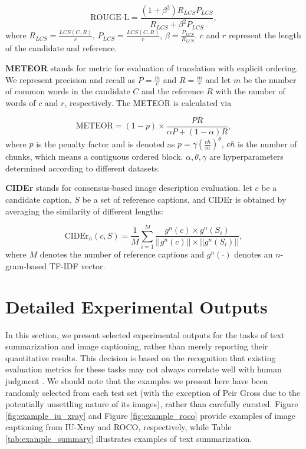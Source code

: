 \documentclass[10pt]{article} \usepackage[preprint]{tmlr}
\begin{document}
\begin{equation}
    \text{ROUGE-L} = \frac{(1+\beta^2) R_{LCS} P_{LCS}}{R_{LCS} + \beta^2 P_{LCS}},
\end{equation}
where $R_{LCS}=\frac{LCS(C,R)}{c}$, $P_{LCS}=\frac{LCS(C,R)}{r}$, $\beta=\frac{P_{LCS}}{R_{LCS}}$. $c$ and $r$ represent the length of the candidate and reference.

\vspace{5pt}
\noindent \textbf{METEOR} stands for metric for evaluation of translation with explicit ordering. We represent precision and recall as $P=\frac{m}{c}$ and $R=\frac{m}{r}$ and let $m$ be the number of common words in the candidate $C$ and the reference $R$ with the number of words of $c$ and $r$, respectively. The METEOR is calculated via

\begin{equation}
    \text{METEOR} = (1 - p) \times \frac{PR}{\alpha P + (1-\alpha) R},
\end{equation}
where $p$ is the penalty factor and is denoted as $p=\gamma (\frac{ch}{m})^{\theta}$, $ch$ is the number of chunks, which means a contiguous ordered block. $\alpha, \theta, \gamma$ are hyperparameters determined according to different datasets.

\vspace{5pt}
\noindent \textbf{CIDEr} stands for consensus-based image description evaluation. let $c$ be a candidate caption, $S$ be a set of reference captions, and CIDEr is obtained by averaging the similarity of different lengths:

\begin{equation}
    \text{CIDEr}_n (c,S) = \frac{1}{M} \sum_{i=1}^M \frac{g^n(c) \times g^n(S_i)}{||g^n(c)|| \times ||g^n(S_i)||},
\end{equation}
where $M$ denotes the number of reference captions and $g^n(\cdot)$ denotes an $n$-gram-based TF-IDF vector.

\section{Detailed Experimental Outputs}
In this section, we present selected experimental outputs for the tasks of text summarization and image captioning, rather than merely reporting their quantitative results. This decision is based on the recognition that existing evaluation metrics for these tasks may not always correlate well with human judgment \citep{kilickaya2017re, cui2018learning}. We should note that the examples we present here have been randomly selected from each test set (with the exception of Peir Gross due to the potentially unsettling nature of its images), rather than carefully curated. Figure \ref{fig:example_iu_xray} and Figure \ref{fig:example_roco} provide examples of image captioning from IU-Xray and ROCO, respectively, while Table \ref{tab:example_summary} illustrates examples of text summarization.
\end{document}

